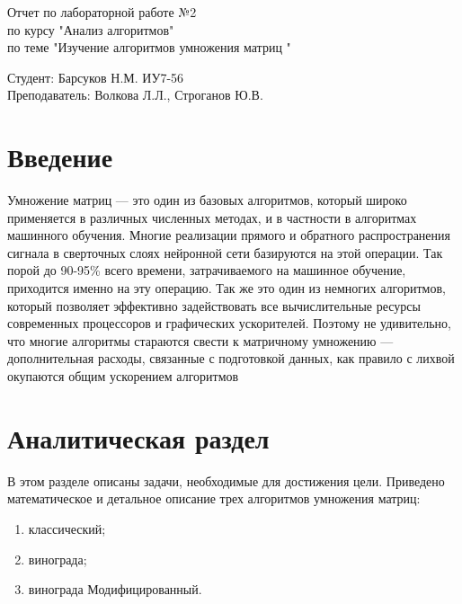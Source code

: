 \documentclass[a4paper, 14pt]{article}
\begin{document}
	\begin{titlepage}
		\begin{center}
			\begin{LARGE}
				Отчет по лабораторной работе №2\\
				по курсу "Анализ алгоритмов"\\
				по теме "Изучение алгоритмов умножения матриц "
			\end{LARGE}
			
			\begin{Large}
				\vspace{10cm}
				Студент: Барсуков Н.М. ИУ7-56\\
				Преподаватель: Волкова Л.Л.,
				Строганов Ю.В.
			\end{Large}
		\end{center}
	\end{titlepage}
	
	\tableofcontents
	
	\newpage
	\section*{Введение}
	
	Умножение матриц — это один из базовых алгоритмов, который широко применяется в различных численных методах, и в частности в алгоритмах машинного обучения. Многие реализации прямого и обратного распространения сигнала в сверточных слоях нейронной сети базируются на этой операции. Так порой до 90-95\% всего времени, затрачиваемого на машинное обучение, приходится именно на эту операцию. Так же это один из немногих алгоритмов, который позволяет эффективно задействовать все вычислительные ресурсы современных процессоров и графических ускорителей. Поэтому не удивительно, что многие алгоритмы стараются свести к матричному умножению — дополнительная расходы, связанные с подготовкой данных, как правило с лихвой окупаются общим ускорением алгоритмов

	\newpage
	\section{Аналитическая раздел}
	
	В этом разделе описаны задачи, необходимые для достижения цели. Приведено математическое и детальное описание трех алгоритмов умножения матриц:
	
	\begin{enumerate}
		\item классический;
		\item винограда;
		\item винограда Модифицированный.
	\end{enumerate}
	
\end{document}
